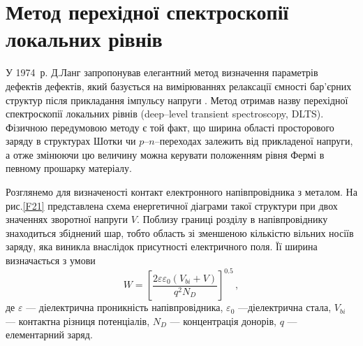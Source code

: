 \documentclass[10pt,a5paper,titlepage,oneside]{book}
\numberwithin{equation}{part}
\renewcommand{\theequation}{\thechapter.\arabic{equation}}
\begin{document}








\renewcommand\bibname{Рекомендована та використана література}

\vspace{-5cm}
\setcounter{page}{3}

\clearpage
 \tableofcontents











\chapter{Метод перехідної спектроскопії \\ локальних рівнів}\label{chapDLTS}

У 1974~р. Д.Ланг запропонував елегантний метод визначення параметрів дефектів дефектів,
який базується на вимірюваннях релаксації ємності бар'єрних структур після прикладання
імпульсу напруги \cite{Lang} .
Метод отримав назву перехідної спектроскопії локальних рівнів (deep--level transient spectroscopy, DLTS).
Фізичною передумовою методу є той факт, що ширина області просторового заряду в структурах Шотки чи $p$--$n$--переходах
залежить від прикладеної напруги, а отже змінюючи цю величину можна керувати положенням рівня Фермі в певному
прошарку матеріалу.

Розглянемо для визначеності контакт електронного напівпровідника з металом.
На рис.\ref{F21} представлена схема енергетичної діаграми такої структури при двох значеннях зворотної напруги $V$.
Поблизу границі розділу в напівпровіднику знаходиться  збіднений шар,
тобто область зі зменшеною кількістю вільних носіїв заряду, яка виникла
внаслідок присутності електричного поля.
Її ширина визначається з умови
\begin{equation}
W=\left[\frac{2\varepsilon\varepsilon_0(V_{bi}+V)}{q^2N_D}\right]^{0.5}\,,
\end{equation}
де
$\varepsilon$ --- діелектрична проникність напівпровідника,
$\varepsilon_0$ ---діелектрична стала,
$V_{bi}$ --- контактна різниця потенціалів,
$N_D$ --- концентрація донорів,
$q$ --- елементарний заряд.
\end{document}
